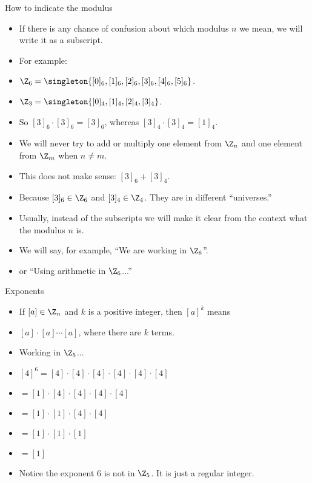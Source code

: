 \documentclass{beamer}
\begin{document}
\begin{frame}{How to indicate the modulus}
\begin{itemize}
  \item If there is any chance of confusion about which modulus $n$ we mean, we will write it as a subscript.
  \item For example:
  \item  $\Z_6=\singleton{[0]_6,[1]_6,[2]_6,[3]_6,[4]_6,[5]_6}$.
  \item  $\Z_3=\singleton{[0]_4,[1]_4,[2]_4,[3]_4}$.
  \item So $[3]_6 \cdot [3]_6 = [3]_6$, whereas $[3]_4 \cdot [3]_4 = [1]_4$.
   \item We will never try to add or multiply one element from $\Z_n$ and one element from $\Z_m$ when $n\not=m$.
  \item This does not make sense: $[3]_6 + [3]_4$.
  \item Because $[3]_6\in\Z_6$ and $[3]_4\in\Z_4$. They are in different ``universes.''
  \item Usually, instead of the subscripts we will make it clear from the context what the modulus $n$ is.
  \item We will say, for example, ``We are working in $\Z_6$''.
  \item or ``Using arithmetic in $\Z_6$...''
\end{itemize}
\end{frame}

\begin{frame}{Exponents}
\begin{itemize}
  \item If $[a]\in\Z_n$ and $k$ is a positive integer, then $[a]^k$ means
  \item $[a]\cdot[a]\cdots[a]$, where there are $k$ terms.
  \item Working in $\Z_5$...
  \item $[4]^6=[4]\cdot[4]\cdot[4]\cdot[4]\cdot[4]\cdot[4]$
  \item $=[1]\cdot[4]\cdot[4]\cdot[4]\cdot[4]$
  \item $=[1]\cdot[1]\cdot[4]\cdot[4]$
  \item $=[1]\cdot[1]\cdot[1]$
  \item $=[1]$
  \item Notice the exponent 6 is not in $\Z_5$. It is just a regular integer.
\end{itemize}
\end{frame}
\end{document}
